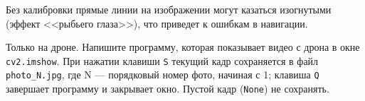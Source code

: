 \begin{infobox}
Без калибровки прямые линии на изображении могут казаться изогнутыми (эффект <<рыбьего глаза>>), что приведет к ошибкам в навигации.
\end{infobox}

\begin{taskbox}[Фотограф]
Только на дроне. Напишите программу, которая показывает видео с дрона в окне \texttt{cv2.imshow}. При нажатии клавиши \texttt{S} текущий кадр сохраняется в файл \texttt{photo\_N.jpg}, где N --- порядковый номер фото, начиная с 1; клавиша \texttt{Q} завершает программу и закрывает окно. Пустой кадр (\texttt{None}) не сохранять.
\end{taskbox}

